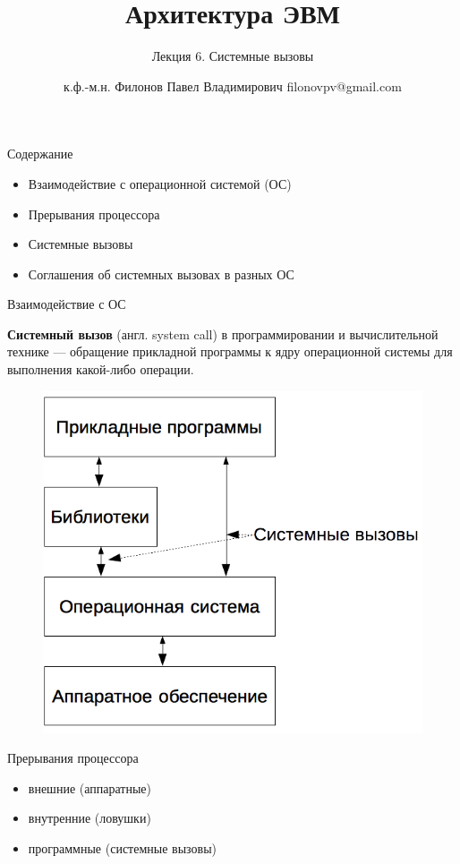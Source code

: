 \documentclass[utf8, russian, aspectratio=1610]{beamer}
\title{Архитектура ЭВМ}
\subtitle{Лекция 6. Системные вызовы}
\author{к.ф.-м.н. Филонов Павел Владимирович \newline filonovpv@gmail.com}
\date{}
\institute[МГТУ ГА] 
{
    Московский Государственный Технический Университет \\
    Гражданской Авиации
}
\begin{document}
\begin{frame}
    \titlepage
\end{frame}
\begin{frame}{Содержание}
    \begin{itemize}
        \item Взаимодействие с операционной системой (ОС)
        \item Прерывания процессора
        \item Системные вызовы
        \item Соглашения об системных вызовах в разных ОС
    \end{itemize}
\end{frame}
\begin{frame}{Взаимодействие с ОС}

    {\bf Системный вызов} (англ. system call) в программировании и вычислительной технике — обращение прикладной программы к ядру операционной системы для выполнения какой-либо операции.
        \begin{figure}
        \centering
        \includegraphics[width=0.5\linewidth]{fig/layers.png}
    \end{figure}
\end{frame}

\begin{frame}{Прерывания процессора}
    \begin{itemize}
        \item внешние (аппаратные)
        \item внутренние (ловушки)
        \item программные (системные вызовы)
    \end{itemize}
\end{frame}
\end{document}
